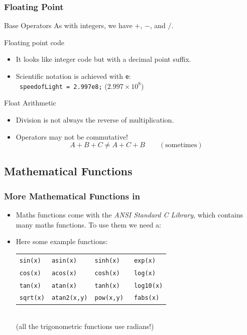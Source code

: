 \documentclass[smaller,handout,table]{beamer}
\begin{document}
\begin{frame}
\frametitle{Floating Point}
\begin{block}{Base Operators}
As with integers, we have $+$, $-$, {\tt *} and $/$.
\end{block}

\begin{block}{Floating point code}
\begin{itemize}
\item It looks like integer code but with a decimal point suffix.
\item Scientific notation is achieved with {\tt e}:\\
{\tt {} speedofLight = 2.997e8;} ($2.997 \times 10^8$)
\end{itemize}
\end{block}

\begin{block}{Float Arithmetic}
\begin{itemize}
\item Division is not always the reverse of multiplication.
\item Operators may not be commutative!
$$ A + B + C \neq A + C + B \qquad \mathrm{(sometimes)}$$
\end{itemize}
\end{block}
\end{frame}

\subsection{Mathematical Functions}
\begin{frame}
\frametitle{More Mathematical Functions in }
\begin{itemize}
\item Maths functions come with the \emph{ANSI Standard C Library}, which contains many maths functions. To use them we need a:
{\tt {} }
\item Here some example functions:
\begin{tabular}{l l l l}
\tt sin(x)&\tt asin(x) & \tt sinh(x) & \tt exp(x)\\
\tt cos(x)&\tt acos(x) & \tt cosh(x) & \tt log(x)\\
\tt tan(x)&\tt atan(x) & \tt tanh(x) & \tt log10(x)\\
\tt sqrt(x)&\tt atan2(x,y)&\tt pow(x,y) & \tt fabs(x)
\end{tabular}\\
\vspace{1ex}
(all the trigonometric functions use radians!)
\end{itemize}
\end{frame}
\end{document}
